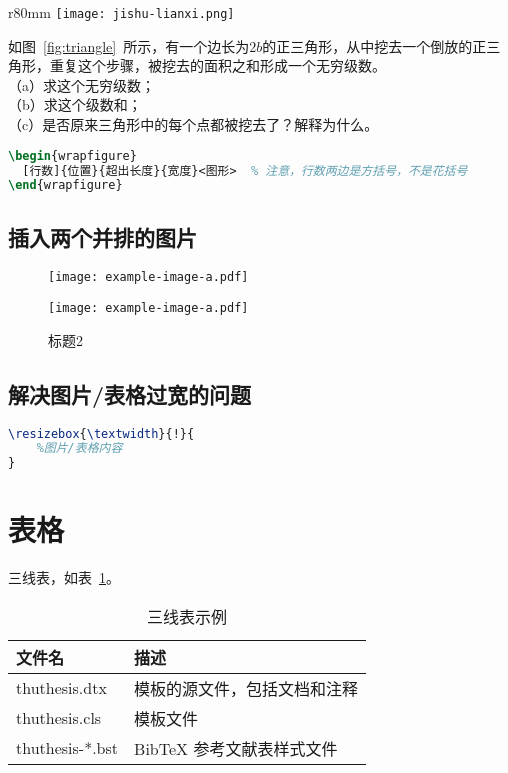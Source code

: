 \begin{wrapfigure}
  [7]{r}{80mm}  %
  \centering
  \texttt{[image: jishu-lianxi.png]}
  \caption{一个三角形图形序列}
  \label{fig:triangle}
\end{wrapfigure}
如图~\ref{fig:triangle}~所示，有一个边长为$2b$的正三角形，从中挖去一个倒放的正三角形，重复这个步骤，被挖去的面积之和形成一个无穷级数。\\
（a）求这个无穷级数；\\
（b）求这个级数和；\\
（c）是否原来三角形中的每个点都被挖去了？解释为什么。
\begin{lstlisting}[language=tex]
\begin{wrapfigure}
  [行数]{位置}{超出长度}{宽度}<图形>  % 注意，行数两边是方括号，不是花括号
\end{wrapfigure}
\end{lstlisting}

\subsection{插入两个并排的图片}
\begin{figure}[H]
  \centering
  \begin{minipage}{0.48\textwidth}
  \centering
  \texttt{[image: example-image-a.pdf]}
  \caption{标题1}
  \end{minipage}
  \begin{minipage}{0.48\textwidth}
  \centering
  \texttt{[image: example-image-a.pdf]}
  \caption{标题2}
  \end{minipage}
\end{figure}

\subsection{解决图片/表格过宽的问题}

\begin{lstlisting}[language=tex]
% \usepackge{graphicx}
\resizebox{\textwidth}{!}{
    %图片/表格内容
}
\end{lstlisting}


\section{表格}

三线表，如表~\ref{tab:three-line}。

\begin{table}[htbp]
  \centering
  \caption{三线表示例}
  \begin{tabular}{ll}
    \toprule
    文件名          & 描述       \\
    \midrule
    thuthesis.dtx   & 模板的源文件，包括文档和注释  \\
    thuthesis.cls   & 模板文件  \\
    thuthesis-*.bst & BibTeX 参考文献表样式文件  \\
    \bottomrule
  \end{tabular}
  \label{tab:three-line}
\end{table}

